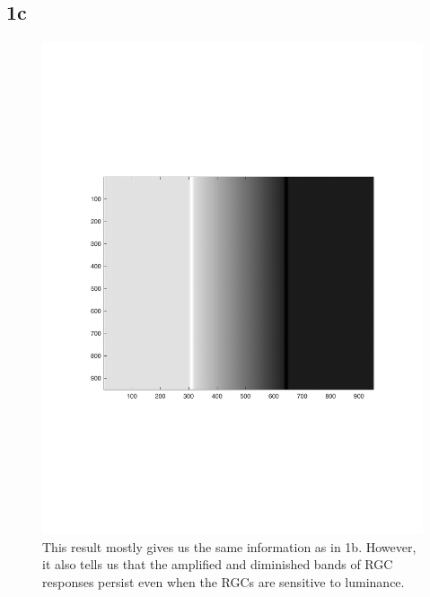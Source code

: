 \documentclass[]{article}
\begin{document}
\subsection*{1c}
\begin{figure}[H]
    \centering
    \includegraphics[width=0.7\linewidth]{problem1C.pdf}
    \caption{This result mostly gives us the same information as in 1b. However, it also tells us that the amplified and diminished bands of RGC responses persist even when the RGCs are sensitive to luminance.}
    \label{fig:my_label}
\end{figure}
\end{document}

